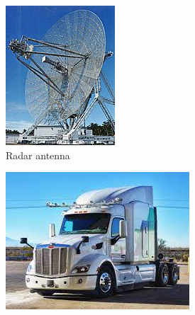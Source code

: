 \begin{figure}[ht] 
    \centering 
    \begin{subfigure}[b]{0.32\textwidth} 
        \includegraphics[width=\textwidth]{figures/Radar_antenna.jpg} 
        \caption{Radar antenna} 
        \label{fig:intro_radar} 
    \end{subfigure} 
    \begin{subfigure}[b]{0.55\textwidth} 
        \includegraphics[width=\textwidth]{figures/truck_cam.jpeg} 

\end{subfigure}
\end{figure}
